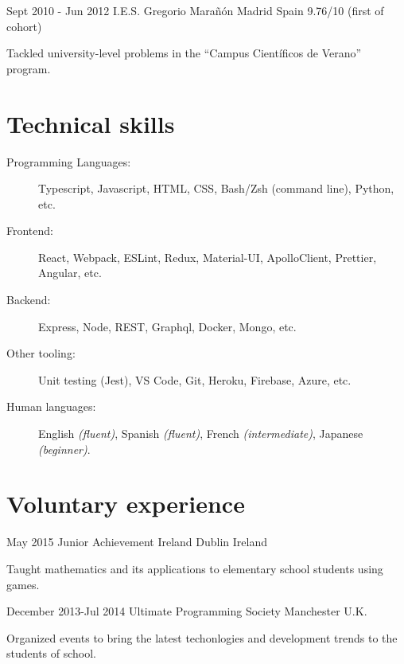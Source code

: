 \documentclass[10pt]{CurriculumVitae}
\begin{document}
      {Sept 2010 - Jun 2012}
      {I.E.S. Gregorio Marañón}
      {Madrid}
      {Spain}
      {9.76/10 (first of cohort)}
      {
        \item Tackled university-level problems in the ``Campus Científicos de Verano'' program.
      }


  \section{Technical skills}
    
    \begin{description}
      \item[Programming Languages:] Typescript, Javascript, HTML, CSS, Bash/Zsh (command line), Python, etc.
      \item[Frontend:] React, Webpack, ESLint, Redux, Material-UI, ApolloClient, Prettier, Angular, etc.
      \item[Backend:] Express, Node, REST, Graphql, Docker, Mongo, etc. 
      \item[Other tooling:] Unit testing (Jest), VS Code, Git, Heroku, Firebase, Azure, etc.
      \item[Human languages:] English \emph{(fluent)}, Spanish \emph{(fluent)}, French \emph{(intermediate)}, Japanese \emph{(beginner)}.
    \end{description}


  \section{Voluntary experience}
     
      {May 2015}
      {Junior Achievement Ireland}
      {Dublin}
      {Ireland}
      {
         \item Taught mathematics and its applications to elementary school students using games.
      }

      {December 2013-Jul 2014}
      {Ultimate Programming Society}
      {Manchester}
      {U.K.}
      {
         \item Organized events to bring the latest techonlogies and development trends to the students of school.
      }
\end{document}
